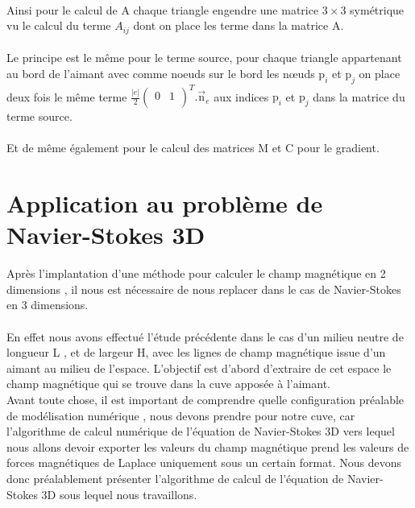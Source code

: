 \documentclass[a4paper,12pt,titlepage]{report}
\begin{document}
\begin{onehalfspace}
\\
Ainsi pour le calcul de A chaque triangle engendre une matrice $ 3\times 3$ symétrique vu le calcul du terme $A_{ij}$ dont on place les terme dans la matrice A.
\\
\\Le principe est le même pour le terme source, pour chaque triangle appartenant au bord de l'aimant avec comme noeuds sur le bord les nœuds $\text{p}_{i}$ et  $\text{p}_{j}$ on place deux fois le même terme $\frac{|e|}{2}\begin{pmatrix}
   									0 & 1\\
								\end{pmatrix}^{T}.
								\vec{\text{n}}_{e}$ 
aux indices $\text{p}_{i}$ et  $\text{p}_{j}$ dans la matrice du terme source.
\\
\\
Et de même également pour le calcul des matrices M et C pour le gradient.		
\chapter{Application au problème de Navier-Stokes 3D}		
Après l'implantation d'une méthode pour calculer le champ magnétique en 2 dimensions , il nous est nécessaire de nous replacer dans le cas de Navier-Stokes en 3 dimensions.
\\ 
\\ 
En effet nous avons effectué l'étude précédente dans le cas d'un milieu neutre de longueur L , et de largeur H, avec les lignes de champ magnétique issue d'un aimant au milieu de l'espace. 
L'objectif est d'abord d'extraire de cet espace le champ magnétique qui se trouve dans la cuve apposée à l'aimant. 
\\
Avant toute chose, il est important de comprendre quelle configuration préalable de modélisation numérique ,  nous devons prendre pour notre cuve, car l'algorithme de calcul numérique de l'équation de Navier-Stokes 3D vers lequel nous allons devoir exporter les valeurs du champ magnétique prend les valeurs de forces magnétiques  de Laplace uniquement sous un certain format.  Nous devons donc préalablement présenter l'algorithme de calcul de l'équation de Navier-Stokes 3D sous lequel nous travaillons. 
\\
\\


\end{onehalfspace}
\end{document}
